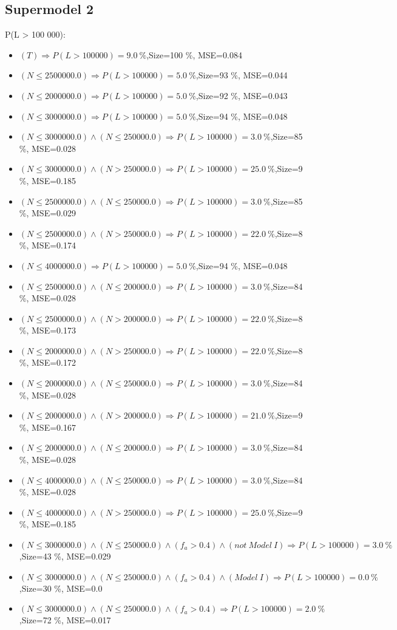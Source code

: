 \documentclass[numbered]{CSL}
\begin{document}
\subsection{Supermodel 2}
P(L > 100 000):
\begin{itemize}
\item $(T) \Rightarrow P(L > 100 000) = 9.0~\%$,\hfill Size=100 \%, MSE=0.084
\item $(N \leq 2500000.0) \Rightarrow P(L > 100 000) = 5.0~\%$,\hfill Size=93 \%, MSE=0.044
\item $(N \leq 2000000.0) \Rightarrow P(L > 100 000) = 5.0~\%$,\hfill Size=92 \%, MSE=0.043
\item $(N \leq 3000000.0) \Rightarrow P(L > 100 000) = 5.0~\%$,\hfill Size=94 \%, MSE=0.048
\item $(N \leq 3000000.0) \land (N \leq 250000.0) \Rightarrow P(L > 100 000) = 3.0~\%$,\hfill Size=85 \%, MSE=0.028
\item $(N \leq 3000000.0) \land (N > 250000.0) \Rightarrow P(L > 100 000) = 25.0~\%$,\hfill Size=9 \%, MSE=0.185
\item $(N \leq 2500000.0) \land (N \leq 250000.0) \Rightarrow P(L > 100 000) = 3.0~\%$,\hfill Size=85 \%, MSE=0.029
\item $(N \leq 2500000.0) \land (N > 250000.0) \Rightarrow P(L > 100 000) = 22.0~\%$,\hfill Size=8 \%, MSE=0.174
\item $(N \leq 4000000.0) \Rightarrow P(L > 100 000) = 5.0~\%$,\hfill Size=94 \%, MSE=0.048
\item $(N \leq 2500000.0) \land (N \leq 200000.0) \Rightarrow P(L > 100 000) = 3.0~\%$,\hfill Size=84 \%, MSE=0.028
\item $(N \leq 2500000.0) \land (N > 200000.0) \Rightarrow P(L > 100 000) = 22.0~\%$,\hfill Size=8 \%, MSE=0.173
\item $(N \leq 2000000.0) \land (N > 250000.0) \Rightarrow P(L > 100 000) = 22.0~\%$,\hfill Size=8 \%, MSE=0.172
\item $(N \leq 2000000.0) \land (N \leq 250000.0) \Rightarrow P(L > 100 000) = 3.0~\%$,\hfill Size=84 \%, MSE=0.028
\item $(N \leq 2000000.0) \land (N > 200000.0) \Rightarrow P(L > 100 000) = 21.0~\%$,\hfill Size=9 \%, MSE=0.167
\item $(N \leq 2000000.0) \land (N \leq 200000.0) \Rightarrow P(L > 100 000) = 3.0~\%$,\hfill Size=84 \%, MSE=0.028
\item $(N \leq 4000000.0) \land (N \leq 250000.0) \Rightarrow P(L > 100 000) = 3.0~\%$,\hfill Size=84 \%, MSE=0.028
\item $(N \leq 4000000.0) \land (N > 250000.0) \Rightarrow P(L > 100 000) = 25.0~\%$,\hfill Size=9 \%, MSE=0.185
\item $(N \leq 3000000.0) \land (N \leq 250000.0) \land (f_a > 0.4) \land (not~Model~I) \Rightarrow P(L > 100 000) = 3.0~\%$,\hfill Size=43 \%, MSE=0.029
\item $(N \leq 3000000.0) \land (N \leq 250000.0) \land (f_a > 0.4) \land (Model~I) \Rightarrow P(L > 100 000) = 0.0~\%$,\hfill Size=30 \%, MSE=0.0
\item $(N \leq 3000000.0) \land (N \leq 250000.0) \land (f_a > 0.4) \Rightarrow P(L > 100 000) = 2.0~\%$,\hfill Size=72 \%, MSE=0.017
\end{itemize}
\end{document}
